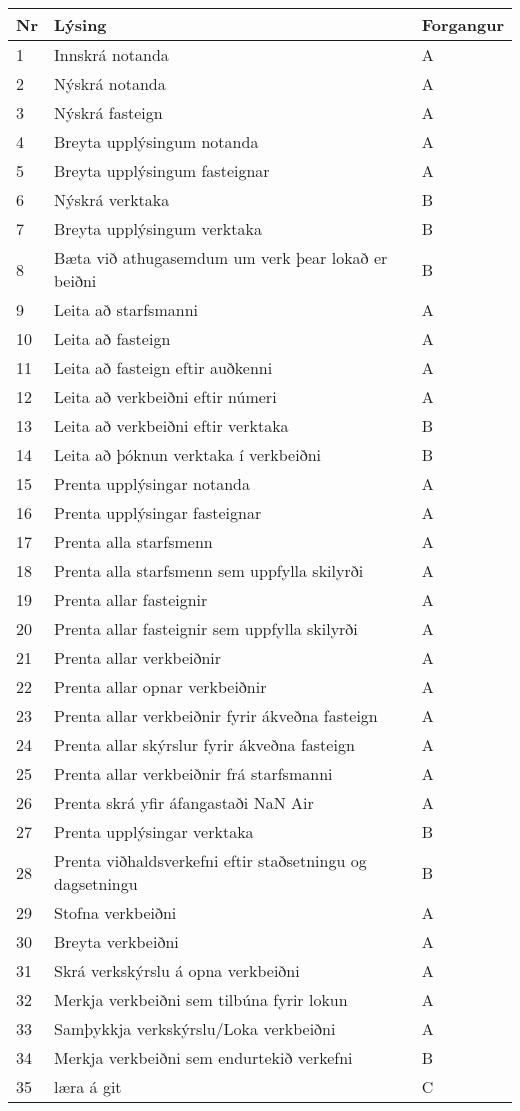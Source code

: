 \documentclass[a4paper]{article}
\begin{document}
\begin{tabular}{|l|l|l|}
\hline
Nr& Lýsing& Forgangur\\
\hline
1& Innskrá notanda & A \\
\hline
2& Nýskrá notanda & A \\
\hline
3& Nýskrá fasteign & A \\
\hline
4& Breyta upplýsingum notanda & A \\
\hline
5& Breyta upplýsingum fasteignar & A \\
\hline
6& Nýskrá verktaka & B \\
\hline
7& Breyta upplýsingum verktaka & B \\
\hline
8& Bæta við athugasemdum um verk þear lokað er beiðni & B \\
\hline
9& Leita að starfsmanni & A \\
\hline
10& Leita að fasteign & A \\
\hline
11& Leita að fasteign eftir auðkenni & A\\
\hline
12& Leita að verkbeiðni eftir númeri & A \\
\hline
13& Leita að verkbeiðni eftir verktaka & B \\
\hline
14& Leita að þóknun verktaka í verkbeiðni & B \\
\hline
15& Prenta upplýsingar notanda & A \\
\hline
16& Prenta upplýsingar fasteignar & A \\
\hline
17& Prenta alla starfsmenn & A \\
\hline
18& Prenta alla starfsmenn sem uppfylla skilyrði & A \\
\hline
19& Prenta allar fasteignir & A \\
\hline
20& Prenta allar fasteignir sem uppfylla skilyrði & A     \\
\hline
21& Prenta allar verkbeiðnir & A \\
\hline
22& Prenta allar opnar verkbeiðnir & A \\
\hline
23& Prenta allar verkbeiðnir fyrir ákveðna fasteign & A \\
\hline
24& Prenta allar skýrslur fyrir ákveðna fasteign & A \\
\hline
25& Prenta allar verkbeiðnir frá starfsmanni & A \\
\hline
26& Prenta skrá yfir áfangastaði NaN Air & A \\
\hline
27& Prenta upplýsingar verktaka & B \\
\hline
28& Prenta viðhaldsverkefni eftir staðsetningu og dagsetningu & B \\
\hline
29& Stofna verkbeiðni & A \\
\hline
30& Breyta verkbeiðni & A \\
\hline
31& Skrá verkskýrslu á opna verkbeiðni & A \\
\hline
32& Merkja verkbeiðni sem tilbúna fyrir lokun & A \\
\hline
33& Samþykkja verkskýrslu/Loka verkbeiðni & A \\
\hline
34& Merkja verkbeiðni sem endurtekið verkefni & B \\
\hline
35&læra á git&C\\
\hline
\end{tabular}
\end{document}
